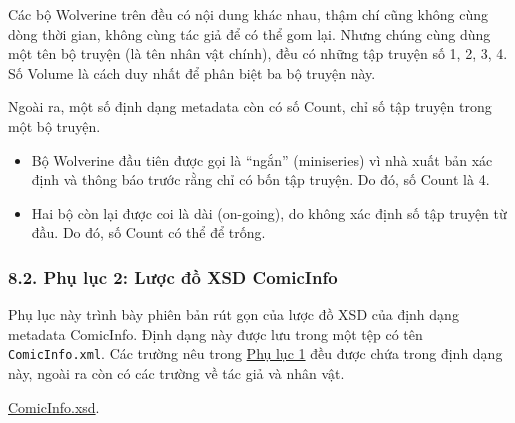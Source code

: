 \documentclass[
]{article}
\providecommand{\tightlist}{%
  \setlength{\itemsep}{0pt}\setlength{\parskip}{0pt}}
\begin{document}
Các bộ Wolverine trên đều có nội dung khác nhau, thậm chí cũng không
cùng dòng thời gian, không cùng tác giả để có thể gom lại. Nhưng chúng
cùng dùng một tên bộ truyện (là tên nhân vật chính), đều có những tập
truyện số 1, 2, 3, 4. Số Volume là cách duy nhất để phân biệt ba bộ
truyện này.

Ngoài ra, một số định dạng metadata còn có số Count, chỉ số tập truyện
trong một bộ truyện.

\begin{itemize}
\tightlist
\item
  Bộ Wolverine đầu tiên được gọi là ``ngắn'' (miniseries) vì nhà xuất
  bản xác định và thông báo trước rằng chỉ có bốn tập truyện. Do đó, số
  Count là 4.
\item
  Hai bộ còn lại được coi là dài (on-going), do không xác định số tập
  truyện từ đầu. Do đó, số Count có thể để trống.
\end{itemize}

\hypertarget{phux1ee5-lux1ee5c-2-lux1b0ux1ee3c-ux111ux1ed3-xsd-comicinfo}{%
\subsubsection{\texorpdfstring{8.2. Phụ lục 2: Lược đồ XSD ComicInfo
}{8.2. Phụ lục 2: Lược đồ XSD ComicInfo }}\label{phux1ee5-lux1ee5c-2-lux1b0ux1ee3c-ux111ux1ed3-xsd-comicinfo}}

Phụ lục này trình bày phiên bản rút gọn của lược đồ XSD của định dạng
metadata ComicInfo. Định dạng này được lưu trong một tệp có tên
\texttt{ComicInfo.xml}. Các trường nêu trong
\protect\hyperlink{P9.1-metadata}{Phụ lục 1} đều được chứa trong định
dạng này, ngoài ra còn có các trường về tác giả và nhân vật.

\href{../assets/ComicInfo.xsd}{ComicInfo.xsd}.
\end{document}
